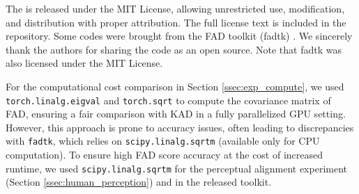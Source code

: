 The  is released under the MIT License, allowing unrestricted use, modification, and distribution with proper attribution. The full license text is included in the repository. Some codes were brought from the FAD toolkit (fadtk) \cite{gui2024adapting,dcase2024,dcase2024report}. We sincerely thank the authors for sharing the code as an open source. Note that fadtk was also licensed under the MIT License. 

For the computational cost comparison in Section \ref{ssec:exp_compute}, we used \texttt{torch.linalg.eigval} and \texttt{torch.sqrt} to compute the covariance matrix of FAD, ensuring a fair comparison with KAD in a fully parallelized GPU setting. However, this approach is prone to accuracy issues, often leading to discrepancies with \texttt{fadtk}, which relies on \texttt{scipy.linalg.sqrtm} (available only for CPU computation). To ensure high FAD score accuracy at the cost of increased runtime, we used \texttt{scipy.linalg.sqrtm} for the perceptual alignment experiment (Section \ref{ssec:human_perception}) and in the released toolkit.

